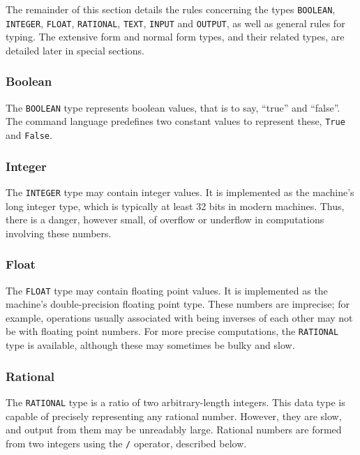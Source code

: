 \medskip

The remainder of this section details the rules concerning the types
{\tt BOOLEAN}, {\tt INTEGER}, {\tt FLOAT}, {\tt RATIONAL}, {\tt TEXT},
{\tt INPUT} and {\tt OUTPUT}, as well as general rules for typing.
The extensive form and normal form types, and their related types, are
detailed later in special sections.

\subsubsection{Boolean}

The {\tt BOOLEAN} type represents boolean values, that is to say, ``true'' and
``false''.  The command language predefines two constant values to
represent these, {\tt True} and {\tt False}.

\subsubsection{Integer}

The {\tt INTEGER} type may contain integer values.  It is implemented
as the machine's long integer type, which is typically at least 32
bits in modern machines.  Thus, there is a danger, however small, of
overflow or underflow in computations involving these numbers.

\subsubsection{Float}

The {\tt FLOAT} type may contain floating point values.  It is implemented
as the machine's double-precision floating point type.  These numbers
are imprecise; for example, operations usually associated with being inverses
of each other may not be with floating point numbers.  For more precise
computations, the {\tt RATIONAL} type is available, although these may
sometimes be bulky and slow.

\subsubsection{Rational}

The {\tt RATIONAL} type is a ratio of two arbitrary-length integers.
This data type is capable of precisely representing any rational
number.  However, they are slow, and output from them may be
unreadably large.  Rational numbers are formed from two integers using
the {\tt /} operator, described below.

